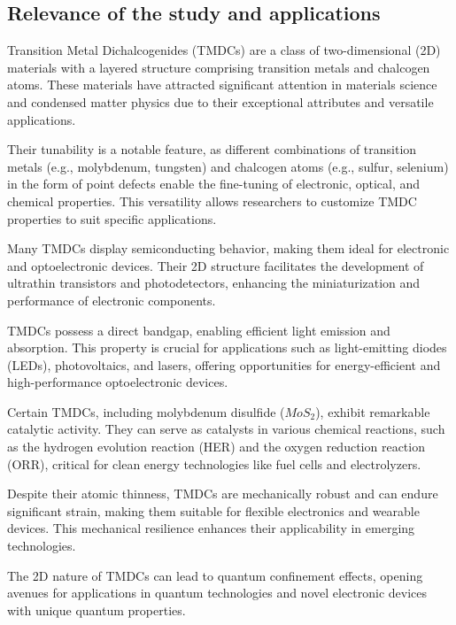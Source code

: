 \subsection{Relevance of the study and applications}

Transition Metal Dichalcogenides (TMDCs) are a class of two-dimensional (2D) materials with a layered structure comprising transition metals and chalcogen atoms. These materials have attracted significant attention in materials science and condensed matter physics due to their exceptional attributes and versatile applications.


Their tunability is a notable feature, as different combinations of transition metals (e.g., molybdenum, tungsten) and chalcogen atoms (e.g., sulfur, selenium) in the form of point defects enable the fine-tuning of electronic, optical, and chemical properties. This versatility allows researchers to customize TMDC properties to suit specific applications.

Many TMDCs display semiconducting behavior, making them ideal for electronic and optoelectronic devices. Their 2D structure facilitates the development of ultrathin transistors and photodetectors, enhancing the miniaturization and performance of electronic components.

TMDCs possess a direct bandgap, enabling efficient light emission and absorption. This property is crucial for applications such as light-emitting diodes (LEDs), photovoltaics, and lasers, offering opportunities for energy-efficient and high-performance optoelectronic devices.

Certain TMDCs, including molybdenum disulfide ($MoS_2$), exhibit remarkable catalytic activity. They can serve as catalysts in various chemical reactions, such as the hydrogen evolution reaction (HER) and the oxygen reduction reaction (ORR), critical for clean energy technologies like fuel cells and electrolyzers.

Despite their atomic thinness, TMDCs are mechanically robust and can endure significant strain, making them suitable for flexible electronics and wearable devices. This mechanical resilience enhances their applicability in emerging technologies.

The 2D nature of TMDCs can lead to quantum confinement effects, opening avenues for applications in quantum technologies and novel electronic devices with unique quantum properties.

